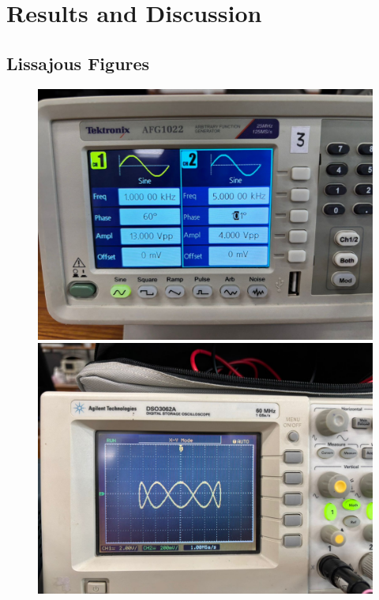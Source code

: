 \documentclass[report]{IEEEtran}
\begin{document}
\section*{Results and Discussion}
\subsection*{Lissajous Figures}


\begin{figure}[h!]
    \centering
    \begin{minipage}{0.3\textwidth}
        \centering
        \includegraphics[width=\textwidth]{figs/function_gen_1.jpeg}
    \end{minipage}
    \hfill
    \begin{minipage}{0.3\textwidth}
        \centering
        \includegraphics[width=\textwidth]{figs/Lissajous_1.jpeg}

\end{minipage}
\end{figure}
\end{document}
